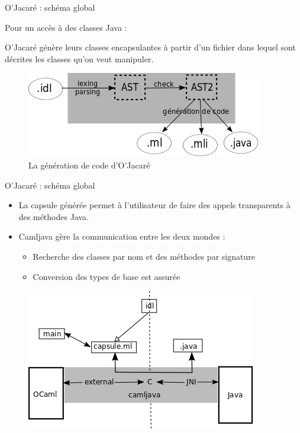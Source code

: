 \documentclass{beamer}
\begin{document}
\begin{frame}{O'Jacaré : schéma global }

Pour un accès à des classes Java :

O'Jacaré génère leurs classes encapsulantes à partir d'un fichier dans lequel sont décrites les classes qu'on veut manipuler.
\medskip
\begin{figure}[h]
  \centering
  \includegraphics[scale=0.6]{schemaOjacare.png}
  \caption{La génération de code d'O'Jacaré}
\end{figure}

\end{frame}





\begin{frame}{O'Jacaré : schéma global }
\begin{itemize}
\item La capsule générée permet à l'utilisateur de faire des appels transparents à des méthodes Java.
\item Camljava gère la communication entre les deux mondes :
\begin{itemize}
\item Recherche des classes par nom et des méthodes par signature
\item Conversion des types de base est assurée
\end{itemize}
\end{itemize}
\begin{figure}[h]
  \centering
  \includegraphics[scale=0.6]{schemaCamljava2.png}
\end{figure}

\end{frame}
\end{document}
